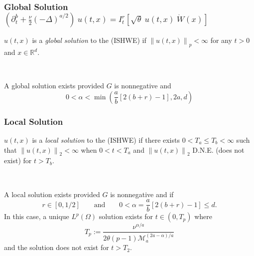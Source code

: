 \documentclass{beamer}%
\numberwithin{equation}{section}
\newcommand{\R}{\mathbb{R}}
\newcommand{\Norm}[1]{\left\|  #1   \right\|}
\begin{document}
	\begin{frame}
		\frametitle{Global Solution\\
			\small $\left(\partial^b_t + \frac{\nu}{2}(-\Delta)^{a/2}\right)\: u(t,x) = I^r_t \left[\sqrt{\theta}\: u(t,x)\: \dot W(x) \right]$}
		\begin{definition}
			$u(t,x)$ is a \textit{global solution} to the {\small (ISHWE)} if $\Norm{u(t,x)}_p < \infty$ for any $t>0$ and $x \in \R^d$.
		\end{definition}
		$\;$ \\
		\begin{theorem}
			A global solution exists provided $G$ is nonnegative and
			\[
			0 < \alpha < \min\left( \frac{a}{b}[2(b+r) -1], 2a, d \right)
			\]
		\end{theorem}
	\end{frame}
	
	\begin{frame}
		\frametitle{Local Solution}
		\begin{definition}
			$u(t,x)$ is a \textit{local solution} to the {\small (ISHWE)} if there exists $0 < T_a \le T_b < \infty$ such that $\Norm{u(t,x)}_2 < \infty$ when $0<t<T_a$ and $\Norm{u(t,x)}_2 $ D.N.E. (does not exist) for $t> T_b$.
		\end{definition}
		$\;$ \\
		\begin{theorem}
			A local solution exists provided $G$ is nonnegative and
			if
			\[
			r\in \left[0,1/2\right] \qquad \text{and} \qquad
			0<\alpha = \frac{a}{b}[2(b+r)-1] \le d.
			\]
			In this case, a unique $L^p(\Omega)$ solution exists for $t \in (0,T_p)$ where
			\[
			T_p := \dfrac{\nu^{\alpha/a}}{2 \theta (p-1) \mathcal{M}_a^{(2a-\alpha)/a}}
			\]
			and the solution does not exist for $t > T_2$.
		\end{theorem}
	\end{frame}
	
	
	
\end{document}
